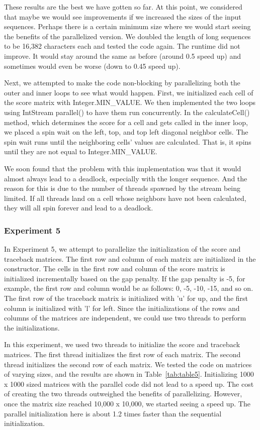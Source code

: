 \documentclass[conference]{IEEEtran}
\begin{document}
These results are the best we have gotten so far. At this point, we considered that maybe we would see improvements if we increased the sizes of the input sequences. Perhaps there is a certain minimum size where we would start seeing the benefits of the parallelized version. We doubled the length of long sequences to be 16,382 characters each and tested the code again. The runtime did not improve. It would stay around the same as before (around 0.5 speed up) and sometimes would even be worse (down to 0.45 speed up).

Next, we attempted to make the code non-blocking by parallelizing both the outer and inner loops to see what would happen. First, we initialized each cell of the score matrix with Integer.MIN\_VALUE. We then implemented the two loops using IntStream parallel() to have them run concurrently. In the calculateCell() method, which determines the score for a cell and gets called in the inner loop, we placed a spin wait on the left, top, and top left diagonal neighbor cells. The spin wait runs until the neighboring cells' values are calculated. That is, it spins until they are not equal to Integer.MIN\_VALUE.

We soon found that the problem with this implementation was that it would almost always lead to a deadlock, especially with the longer sequence. And the reason for this is due to the number of threads spawned by the stream being limited. If all threads land on a cell whose neighbors have not been calculated, they will all spin forever and lead to a deadlock.

\subsubsection{Experiment 5}
In Experiment 5, we attempt to parallelize the initialization of the score and traceback matrices. The first row and column of each matrix are initialized in the constructor. The cells in the first row and column of the score matrix is initialized incrementally based on the gap penalty. If the gap penalty is -5, for example, the first row and column would be as follows: 0, -5, -10, -15,  and so on. The first row of the traceback matrix is initialized with 'u' for up, and the first column is initialized with 'l' for left. Since the initializations of the rows and columns of the matrices are independent, we could use two threads to perform the initializations.

In this experiment, we used two threads to initialize the score and traceback matrices. The first thread initializes the first row of each matrix. The second thread initializes the second row of each matrix. We tested the code on matrices of varying sizes, and the results are shown in Table~\ref{tab:table5}. Initializing 1000 x 1000 sized matrices with the parallel code did not lead to a speed up. The cost of creating the two threads outweighed the benefits of parallelizing. However, once the matrix size reached 10,000 x 10,000, we started seeing a speed up. The parallel initialization here is about 1.2 times  faster than the sequential initialization.
\end{document}
